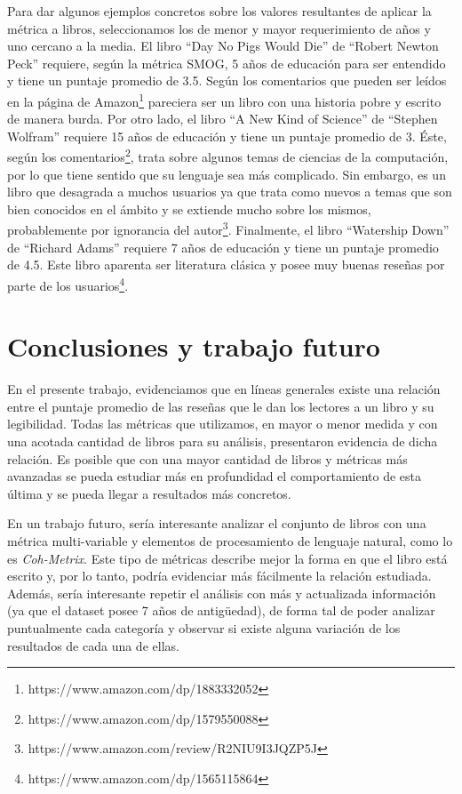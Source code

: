 \documentclass[12pt,journal,compsoc]{IEEEtran}
\begin{document}
Para dar algunos ejemplos concretos sobre los valores resultantes de aplicar la métrica a libros, seleccionamos los de menor y mayor requerimiento de años y uno cercano a la media. El libro ``Day No Pigs Would Die'' de ``Robert Newton Peck'' requiere, según la métrica SMOG, 5 años de educación para ser entendido y tiene un puntaje promedio de 3.5. Según los comentarios que pueden ser leídos en la página de Amazon\footnote{https://www.amazon.com/dp/1883332052} pareciera ser un libro con una historia pobre y escrito de manera burda. Por otro lado, el libro ``A New Kind of Science'' de ``Stephen Wolfram'' requiere 15 años de educación y tiene un puntaje promedio de 3. Éste, según los comentarios\footnote{https://www.amazon.com/dp/1579550088}, trata sobre algunos temas de ciencias de la computación, por lo que tiene sentido que su lenguaje sea más complicado. Sin embargo, es un libro que desagrada a muchos usuarios ya que trata como nuevos a temas que son bien conocidos en el ámbito y se extiende mucho sobre los mismos, probablemente por ignorancia del autor\footnote{https://www.amazon.com/review/R2NIU9I3JQZP5J}. Finalmente, el libro ``Watership Down'' de ``Richard Adams'' requiere 7 años de educación y tiene un puntaje promedio de 4.5. Este libro aparenta ser literatura clásica y posee muy buenas reseñas por parte de los usuarios\footnote{https://www.amazon.com/dp/1565115864}.


\section{Conclusiones y trabajo futuro}\label{sec:conclusion} 

En el presente trabajo, evidenciamos que en líneas generales existe una relación entre el puntaje promedio de las reseñas que le dan los lectores a un libro y su legibilidad. Todas las métricas que utilizamos, en mayor o menor medida y con una acotada cantidad de libros para su análisis, presentaron evidencia de dicha relación. Es posible que con una mayor cantidad de libros y métricas más avanzadas se pueda estudiar más en profundidad el comportamiento de esta última y se pueda llegar a resultados más concretos.

En un trabajo futuro, sería interesante analizar el conjunto de libros con una métrica multi-variable y elementos de procesamiento de lenguaje natural, como lo es \textit{Coh-Metrix}\cite{graesser}. Este tipo de métricas describe mejor la forma en que el libro está escrito y, por lo tanto, podría evidenciar más fácilmente la relación estudiada. Además, sería interesante repetir el análisis con más y actualizada información (ya que el dataset posee 7 años de antigüedad), de forma tal de poder analizar puntualmente cada categoría y observar si existe alguna variación de los resultados de cada una de ellas.
\end{document}

